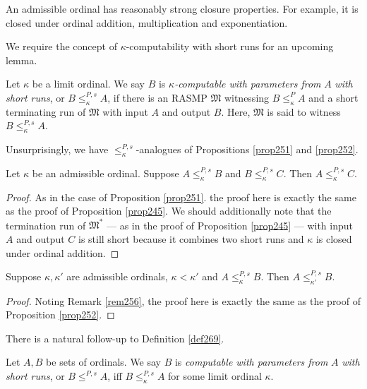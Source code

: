 \documentclass[12pt]{article}
\numberwithin{equation}{section}
\begin{document}
An admissible ordinal has reasonably strong closure properties. For example, it is closed under ordinal addition, multiplication and exponentiation.

We require the concept of $\kappa$-computability with short runs for an upcoming lemma.

\begin{defi}\label{def269}
Let $\kappa$ be a limit ordinal. We say $B$ is $\kappa$\emph{-computable with parameters from} $A$ \emph{with short runs}, or $B \leq^{P, s}_{\kappa} A$, if there is an RASMP $\mathfrak{M}$ witnessing $B \leq^P_{\kappa} A$ and a short terminating run of $\mathfrak{M}$ with input $A$ and output $B$. Here, $\mathfrak{M}$ is said to witness $B \leq^{P, s}_{\kappa} A$.
\end{defi}

Unsurprisingly, we have $\leq^{P, s}_{\kappa}$-analogues of Propositions \ref{prop251} and \ref{prop252}.

\begin{prop}\label{prop270n}
Let $\kappa$ be an admissible ordinal. Suppose $A \leq^{P, s}_{\kappa} B$ and $B \leq^{P, s}_{\kappa} C$. Then $A \leq^{P, s}_{\kappa} C$.
\end{prop}

\begin{proof}
As in the case of Proposition \ref{prop251}. the proof here is exactly the same as the proof of Proposition \ref{prop245}. We should additionally note that the termination run of $\mathfrak{M}^*$ --- as in the proof of Proposition \ref{prop245} --- with input $A$ and output $C$ is still short because it combines two short runs and $\kappa$ is closed under ordinal addition.
\end{proof}

\begin{prop}\label{prop271n}
Suppose $\kappa, \kappa'$ are admissible ordinals, $\kappa < \kappa'$ and $A \leq^{P, s}_{\kappa} B$. Then $A \leq^{P, s}_{\kappa'} B$.
\end{prop}

\begin{proof}
Noting Remark \ref{rem256}, the proof here is exactly the same as the proof of Proposition \ref{prop252}.
\end{proof}

There is a natural follow-up to Definition \ref{def269}.

\begin{defi}
Let $A, B$ be sets of ordinals. We say $B$ is \emph{computable with parameters from} $A$ \emph{with short runs}, or $B \leq^{P, s} A$, iff $B \leq^{P, s}_{\kappa} A$ for some limit ordinal $\kappa$.
\end{defi}
\end{document}
